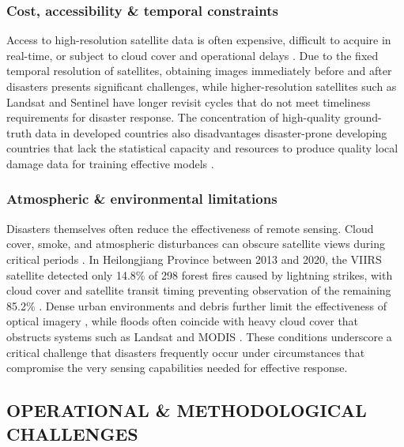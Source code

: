 \documentclass[conference,a4paper]{IEEEtran}
\begin{document}
\subsubsection{\textbf{Cost, accessibility \& temporal constraints}}
Access to high-resolution satellite data is often expensive, difficult to acquire in real-time, or subject to cloud cover and operational delays \cite{lagapEnhancingPostDisasterDamage2025}. Due to the fixed temporal resolution of satellites, obtaining images immediately before and after disasters presents significant challenges, while higher-resolution satellites such as Landsat and Sentinel have longer revisit cycles that do not meet timeliness requirements for disaster response. The concentration of high-quality ground-truth data in developed countries also disadvantages disaster-prone developing countries that lack the statistical capacity and resources to produce quality local damage data for training effective models \cite{kimDisasterAssessmentUsing2022}.

\subsubsection{\textbf{Atmospheric \& environmental limitations}}
Disasters themselves often reduce the effectiveness of remote sensing. Cloud cover, smoke, and atmospheric disturbances can obscure satellite views during critical periods \cite{lagapEnhancingPostDisasterDamage2025}. In Heilongjiang Province between 2013 and 2020, the VIIRS satellite detected only 14.8\% of 298 forest fires caused by lightning strikes, with cloud cover and satellite transit timing preventing observation of the remaining 85.2\% \cite{jiaoForestFirePatterns2023}. Dense urban environments and debris further limit the effectiveness of optical imagery \cite{lagapEnhancingPostDisasterDamage2025}, while floods often coincide with heavy cloud cover that obstructs systems such as Landsat and MODIS \cite{teohExploringGenerativeAI2024}. These conditions underscore a critical challenge that disasters frequently occur under circumstances that compromise the very sensing capabilities needed for effective response.


\subsection{OPERATIONAL \& METHODOLOGICAL CHALLENGES}
\end{document}
